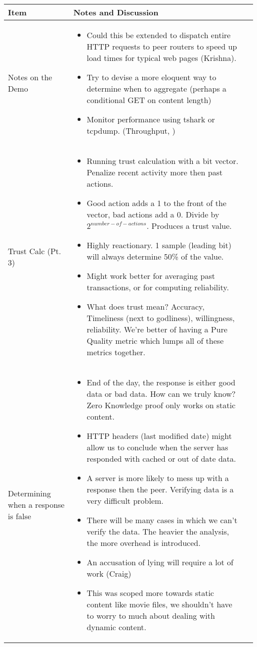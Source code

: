 \documentclass[a4wide,10pt]{extarticle}
\begin{document}
\vspace{0.5cm}
\begin{center}
\begin{tabular}{| m{3.0cm} | m{12.6cm} | m{2cm}|} \hline
\textbf{Item} & \textbf{Notes and Discussion}\\ \hline

Notes on the Demo & 
	\begin{itemize}
		\item Could this be extended to dispatch entire HTTP requests to peer routers to speed up load times for typical web pages (Krishna).
		\item Try to devise a more eloquent way to determine when to aggregate (perhaps a conditional GET on content length)
		\item Monitor performance using tshark or tcpdump. (Throughput, )
	\end{itemize} 
\\ \hline

Trust Calc (Pt. 3) &
	\begin{itemize}
		\item Running trust calculation with a bit vector. Penalize recent activity more then past actions. 
		\item Good action adds a 1 to the front of the vector, bad actions add a 0. Divide by $2^{number-of-actions}$. Produces a trust value.
		\item Highly reactionary. 1 sample (leading bit) will always determine 50\% of the value.
		\item Might work better for averaging past transactions, or for computing reliability.
		\item What does trust mean? Accuracy, Timeliness (next to godliness), willingness, reliability. We're better of having a Pure Quality metric which lumps all of these metrics together.
	\end{itemize}
\\ \hline

Determining when a response is false &
	\begin{itemize}
		\item End of the day, the response is either good data or bad data. How can we truly know? Zero Knowledge proof only works on static content.
		\item HTTP headers (last modified date) might allow us to conclude when the server has responded with cached or out of date data.
		\item A server is more likely to mess up with a response then the peer. Verifying data is a very difficult problem.
		\item There will be many cases in which we can't verify the data. The heavier the analysis, the more overhead is introduced.
		\item An accusation of lying will require a lot of work (Craig)
		\item This was scoped more towards static content like movie files, we shouldn't have to worry to much about dealing with dynamic content.
	\end{itemize}
\\ \hline


\end{tabular}
\end{center}
\end{document}
